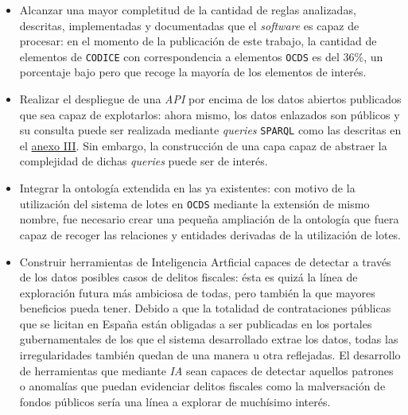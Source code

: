     \begin{itemize}
        \item Alcanzar una mayor completitud de la cantidad de reglas analizadas, descritas, implementadas y documentadas que el \textit{software} es capaz de procesar: en el momento de la publicación de este trabajo, la cantidad de elementos de \texttt{CODICE} con correspondencia a elementos \texttt{OCDS} es del 36\%, un porcentaje bajo pero que recoge la mayoría de los elementos de interés.
        \item Realizar el despliegue de una \textit{API} por encima de los datos abiertos publicados que sea capaz de explotarlos: ahora mismo, los datos enlazados son públicos y su consulta puede ser realizada mediante \textit{queries} \texttt{SPARQL} como las descritas en el \hyperref[annex:sparql]{anexo III}. Sin embargo, la construcción de una capa capaz de abstraer la complejidad de dichas \textit{queries} puede ser de interés.
        \item Integrar la ontología extendida en las ya existentes: con motivo de la utilización del sistema de lotes en \texttt{OCDS} mediante la extensión de mismo nombre, fue necesario crear una pequeña ampliación de la ontología \cite{MYONT} que fuera capaz de recoger las relaciones y entidades derivadas de la utilización de lotes.
        \item Construir herramientas de Inteligencia Artficial capaces de detectar a través de los datos posibles casos de delitos fiscales: ésta es quizá la línea de exploración futura más ambiciosa de todas, pero también la que mayores beneficios pueda tener. Debido a que la totalidad de contrataciones públicas que se licitan en España están obligadas a ser publicadas en los portales gubernamentales de los que el sistema desarrollado extrae los datos, todas las irregularidades también quedan de una manera u otra reflejadas. El desarrollo de herramientas que mediante \textit{IA} sean capaces de detectar aquellos patrones o anomalías que puedan evidenciar delitos fiscales como la malversación de fondos públicos sería una línea a explorar de muchísimo interés.
    \end{itemize}
\newpage